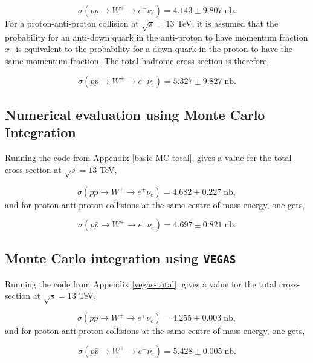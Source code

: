 \documentclass[a4paper,11pt]{article}
\begin{document}
\begin{equation}\label{pp} 
	\sigma(pp \rightarrow W^+ \rightarrow e^+ \nu_e) = 4.143 \pm 9.807\; \text{nb}.
\end{equation}
For a proton-anti-proton collision at $\sqrt{s} = 13$ TeV, it is assumed that the probability for an anti-down quark in the anti-proton to have momentum fraction $x_1$ is equivalent to the probability for a down quark in the proton to have the same momentum fraction. The total hadronic cross-section is therefore,

\begin{equation}
	\sigma(p\bar{p} \rightarrow W^+ \rightarrow e^+ \nu_e) = 5.327 \pm 9.827\; \text{nb}.
\end{equation}

\subsection{Numerical evaluation using Monte Carlo Integration}
Running the code from Appendix \ref{basic-MC-total}, gives a value for the total cross-section at $\sqrt{s} = 13$ TeV,

\begin{equation}
	\sigma(pp \rightarrow W^+ \rightarrow e^+ \nu_e) = 4.682 \pm 0.227\; \text{nb},
\end{equation}
and for proton-anti-proton collisions at the same centre-of-mass energy, one gets,

\begin{equation}
	\sigma(p\bar{p} \rightarrow W^+ \rightarrow e^+ \nu_e)= 4.697 \pm 0.821\; \text{nb}.
\end{equation}

\subsection{Monte Carlo integration using \texttt{VEGAS}}
Running the code from Appendix \ref{vegas-total}, gives a value for the total cross-section at $\sqrt{s} = 13$ TeV,

\begin{equation}
	\sigma(pp \rightarrow W^+ \rightarrow e^+ \nu_e) = 4.255 \pm  0.003\; \text{nb},
\end{equation}
and for proton-anti-proton collisions at the same centre-of-mass energy, one gets,

\begin{equation}
	\sigma(p\bar{p} \rightarrow W^+ \rightarrow e^+ \nu_e)= 5.428 \pm 0.005\; \text{nb}.
\end{equation}
\end{document}
